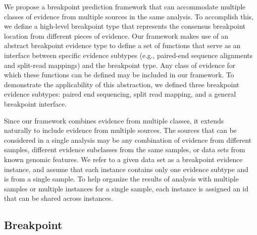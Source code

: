 \documentclass[11pt]{article}
\begin{document}
We propose a breakpoint prediction framework that can accommodate multiple
classes of evidence from multiple sources in the same analysis.  To accomplish
this, we define a high-level breakpoint type that represents the consensus
breakpoint location from different pieces of evidence.  Our framework makes use
of an abstract breakpoint evidence type to define a set of functions that serve
as an interface between specific evidence subtypes (e.g., paired-end sequence
alignments and split-read mappings) and the breakpoint type.  Any class of
evidence for which these functions can be defined may be included in our
framework.  To demonstrate the applicability of this abstraction, we defined
three breakpoint evidence subtypes: paired end sequencing, split read mapping,
and a general breakpoint interface. 

Since our framework combines evidence from multiple classes, it extends
naturally to include evidence from multiple sources.  The sources that can be
considered in a single analysis may be any combination of evidence from
different samples, different evidence subclasses from the same samples, or
data sets from known genomic features.  We refer to a given data set as a
breakpoint evidence instance, and assume that each instance contains only one
evidence subtype and is from a single sample.  To help organize the results of
analysis with multiple samples or multiple instances for a single sample,
each instance is assigned an id that can be shared across instances.


\subsection{Breakpoint}
\end{document}
